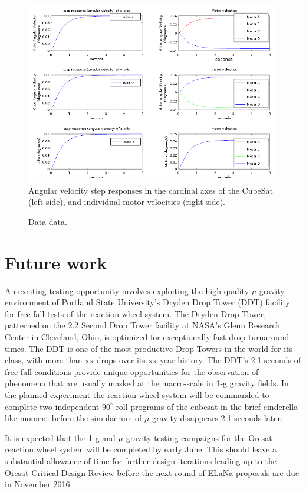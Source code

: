 \documentclass[]{aiaa-tc}%
\begin{document}
\begin{figure}[h!]
  \centering
  \includegraphics[width=0.9\linewidth]{simulation.png}
  \caption{Angular velocity step responses in the cardinal axes of the CubeSat (left side), and individual motor velocities (right side).}
  \label{fig:simulation}
\end{figure}

\begin{figure}[!ht]
 \centering
 
 \caption{Data data.}
\end{figure}
\section{Future work}
An exciting testing opportunity involves exploiting the high-quality $\mu$-gravity environment of Portland State University's Dryden Drop Tower (DDT) facility for free fall tests of the reaction wheel system. The Dryden Drop Tower, patterned on the 2.2 Second Drop Tower facility at NASA's Glenn Research Center in Cleveland, Ohio, is optimized for exceptionally fast drop turnaround times. The DDT is one of the most productive Drop Towers in the world for its class, with more than xx drops over its xx year history. The DDT's 2.1 seconds of free-fall conditions provide unique opportunities for the observation of phenomena that are usually masked at the macro-scale in 1-g gravity fields. In the planned experiment the reaction wheel system will be commanded to complete two independent $90^{\circ}$ roll programs of the cubesat in the brief cinderella-like moment before the simulacrum of $\mu$-gravity disappears 2.1 seconds later.

It is expected that the 1-g and $\mu$-gravity testing campaigns for the Oresat reaction wheel system will be completed by early June. This should leave a substantial allowance of time for further design iterations leading up to the Oresat Critical Design Review before the next round of ELaNa proposals are due in November 2016.
\end{document}
